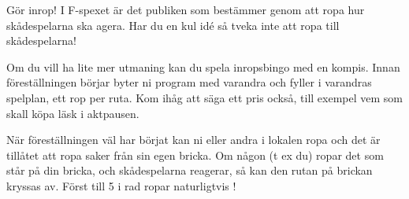 \begingroup
\fontsize{11}{13}\selectfont
{}\baselineskip
G{\"o}r inrop!
I F-spexet {\"a}r det publiken som best{\"a}mmer genom att ropa hur skådespelarna ska agera. Har du en kul id{\'e} s{\aa} tveka inte att ropa till skådespelarna!

Om du vill ha lite mer utmaning kan du spela inropsbingo med en kompis. 
Innan f{\"o}rest{\"a}llningen b{\"o}rjar byter ni program med varandra och fyller i varandras spelplan, ett rop per ruta. Kom ih{\aa}g att s{\"a}ga ett pris ocks{\aa}, till exempel vem som skall k{\"o}pa l{\"a}sk i aktpausen.

N{\"a}r f{\"o}rest{\"a}llningen v{\"a}l har b{\"o}rjat kan ni eller andra i lokalen ropa och det {\"a}r till{\aa}tet att ropa saker fr{\aa}n sin egen bricka.  Om n{\aa}gon (t ex du) ropar det som st{\aa}r p{\aa} din bricka, och skådespelarna reagerar, s{\aa} kan den rutan p{\aa} brickan kryssas av. F{\"o}rst till 5 i rad ropar naturligtvis !

%
%

\begingroup\fontsize{10}{12}\selectfont


